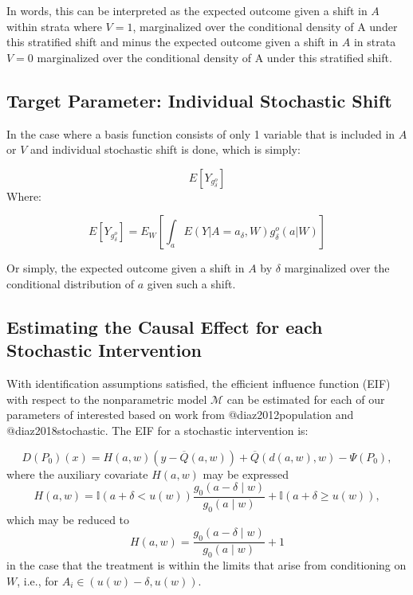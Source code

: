 \documentclass[
]{article}
\begin{document}
In words, this can be interpreted as the expected outcome given a shift
in \(A\) within strata where \(V = 1\), marginalized over the
conditional density of A under this stratified shift and minus the
expected outcome given a shift in \(A\) in strata \(V = 0\) marginalized
over the conditional density of A under this stratified shift.

\hypertarget{target-parameter-individual-stochastic-shift}{%
\subsection{Target Parameter: Individual Stochastic
Shift}\label{target-parameter-individual-stochastic-shift}}

In the case where a basis function consists of only 1 variable that is
included in \(A\) or \(V\) and individual stochastic shift is done,
which is simply:

\[E[Y_{g^o_{\delta}}]\] Where:

\[E[Y_{g^o_{\delta}}] = E_W [\int_{a} E(Y|A=a_{ \delta}, W)g^o_{\delta}(a|W)]\]

Or simply, the expected outcome given a shift in \(A\) by \(\delta\)
marginalized over the conditional distribution of \(a\) given such a
shift.

\hypertarget{estimating-the-causal-effect-for-each-stochastic-intervention}{%
\subsection{Estimating the Causal Effect for each Stochastic
Intervention}\label{estimating-the-causal-effect-for-each-stochastic-intervention}}

With identification assumptions satisfied, the efficient influence
function (EIF) with respect to the nonparametric model \(\mathcal{M}\)
can be estimated for each of our parameters of interested based on work
from @diaz2012population and @diaz2018stochastic. The EIF for a
stochastic intervention is:

\begin{equation}
  D(P_0)(x) = H(a, w)({y - \overline{Q}(a, w)}) +
  \overline{Q}(d(a, w), w) - \Psi(P_0),
 
\end{equation} where the auxiliary covariate \(H(a,w)\) may be expressed
\begin{equation}
  H(a,w) = \mathbb{I}(a + \delta < u(w)) \frac{g_0(a - \delta \mid w)}
  {g_0(a \mid w)} + \mathbb{I}(a + \delta \geq u(w)),
  
\end{equation} which may be reduced to \begin{equation}
  H(a,w) = \frac{g_0(a - \delta \mid w)}{g_0(a \mid w)} + 1
 
\end{equation} in the case that the treatment is within the limits that
arise from conditioning on \(W\), i.e., for
\(A_i \in (u(w) - \delta, u(w))\).
\end{document}
